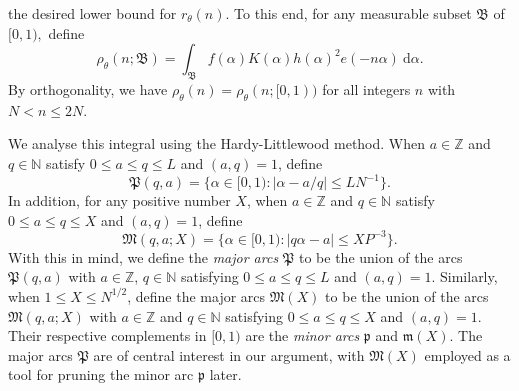 \documentclass[12pt,english,reqno]{amsart}
\theoremstyle{definition}
\theoremstyle{remark}
\numberwithin{equation}{section}
\numberwithin{equation}{section}
\numberwithin{figure}{section}
\theoremstyle{plain}
\theoremstyle{plain}
\theoremstyle{plain}
\theoremstyle{plain}
\numberwithin{equation}{section}
\numberwithin{thm}{section}
\begin{document}
the desired lower bound for $r_{\theta}(n)$. To this end, for any
measurable subset $\mathfrak{B}$ of $[0,1),$ define
\begin{equation}
\rho_{\theta}(n;\mathfrak{B})=\int_{\mathfrak{B}}f(\alpha)K(\alpha)h(\alpha)^{2}e(-n\alpha)\:\mathrm{d}\alpha.\label{eq:rho(n,B) for existence}\end{equation}
By orthogonality, we have $\rho_{\theta}(n)=\rho_{\theta}(n;[0,1))$
for all integers $n$ with $N<n\leq2N$. 
\par We analyse this integral using the Hardy-Littlewood method. When $a\in\mathbb{Z}$
and $q\in\mathbb{N}$ satisfy $0\leq a\leq q\leq L$ and $(a,q)=1$,
define
\begin{equation}
\mathfrak{P}(q,a)=\{\alpha\in[0,1):|\alpha-a/q|\leq LN^{-1}\}.\label{eq:P(q,a)}\end{equation}
In addition, for any positive number $X$, when $a\in\mathbb{Z}$ and $q\in\mathbb{N}$ satisfy $0\leq a\leq q\leq X$
and $(a,q)=1$, define
\begin{equation}
\mathfrak{M}(q,a;X)=\{\alpha\in[0,1):|q\alpha-a|\leq XP^{-3}\}.\label{eq:M(q,a;X)}\end{equation}
With this in mind, we define the \textit{major arcs} $\mathfrak{P}$
to be the union of the arcs $\mathfrak{P}(q,a)$ with $a\in\mathbb{Z}$,
$q\in\mathbb{N}$ satisfying $0\leq a\leq q\leq L$ and $(a,q)=1$.
Similarly, when $1\leq X\leq N^{1/2}$, define the major arcs $\mathfrak{M}(X)$
to be the union of the arcs $\mathfrak{M}(q,a;X)$ with $a\in\mathbb{Z}$
and $q\in\mathbb{N}$ satisfying $0\leq a\leq q\leq X$ and $(a,q)=1$.
Their respective complements in $[0,1)$ are the \textit{minor arcs}
$\mathfrak{p}$ and $\mathfrak{m}(X)$. The major arcs $\mathfrak{P}$
are of central interest in our argument, with $\mathfrak{M}(X)$ employed
as a tool for pruning the minor arc $\mathfrak{p}$ later.
\end{document}
